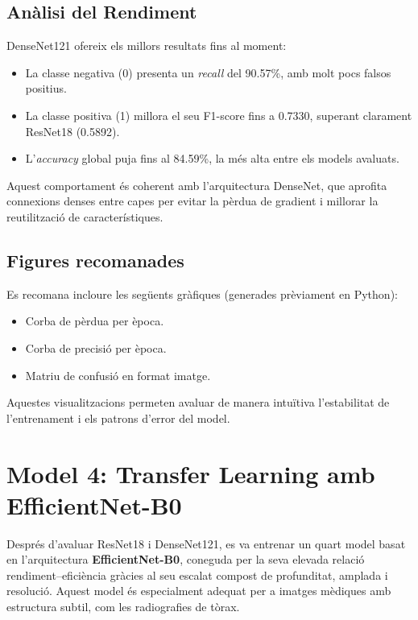 \documentclass[12pt,a4paper]{article}
\begin{document}
\subsection{Anàlisi del Rendiment}

DenseNet121 ofereix els millors resultats fins al moment:

\begin{itemize}
    \item La classe negativa (0) presenta un \textit{recall} del 90.57\%, amb molt pocs falsos positius.
    \item La classe positiva (1) millora el seu F1-score fins a 0.7330, superant clarament ResNet18 (0.5892).
    \item L’\textit{accuracy} global puja fins al 84.59\%, la més alta entre els models avaluats.
\end{itemize}

Aquest comportament és coherent amb l’arquitectura DenseNet, que aprofita connexions
denses entre capes per evitar la pèrdua de gradient i millorar la reutilització de
característiques.

\subsection{Figures recomanades}

Es recomana incloure les següents gràfiques (generades prèviament en Python):

\begin{itemize}
    \item Corba de pèrdua per època.
    \item Corba de precisió per època.
    \item Matriu de confusió en format imatge.
\end{itemize}

Aquestes visualitzacions permeten avaluar de manera intuïtiva l’estabilitat de
l’entrenament i els patrons d’error del model.



\section{Model 4: Transfer Learning amb EfficientNet-B0}

Després d’avaluar ResNet18 i DenseNet121, es va entrenar un quart model basat en
l’arquitectura \textbf{EfficientNet-B0}, coneguda per la seva elevada relació
rendiment–eficiència gràcies al seu escalat compost de profunditat, amplada i
resolució. Aquest model és especialment adequat per a imatges mèdiques amb estructura
subtil, com les radiografies de tòrax.
\end{document}
